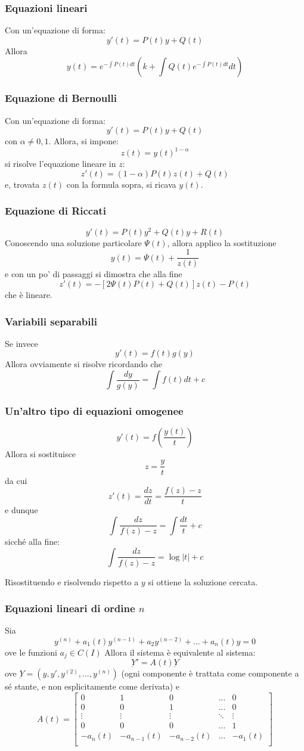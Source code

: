 \documentclass[a4paper,12pt]{article}
\begin{document}
\subsubsection{Equazioni lineari}
Con un'equazione di forma:
$$y'(t) = P(t)y+Q(t)$$
Allora
$$y(t)=e^{- \displaystyle\int P(t)dt}\left(k + \int Q(t)e^{-\displaystyle\int P(t)dt}dt\right)$$
\subsubsection{Equazione di Bernoulli}
Con un'equazione di forma:
$$y'(t) = P(t)y+Q(t)$$
con $\alpha \neq 0, 1$. Allora, si impone:
$$ z(t)=y(t)^{1-\alpha} $$
si risolve l'equazione lineare in $z$: $$z'(t)=(1-\alpha)P(t)z(t)+Q(t)$$ e, trovata $z(t)$ con la formula sopra, si ricava $y(t)$.

\subsubsection{Equazione di Riccati}
$$y'(t) = P(t)y^2+Q(t)y+R(t)$$
Conoscendo una soluzione particolare $\Psi(t)$, allora applico la sostituzione
$$y(t)=\Psi(t)+\dfrac{1}{z(t)}$$
e con un po' di passaggi si dimostra che alla fine
$$z'(t)= -\left[2\Psi(t)P(t)+Q(t)\right]z(t)-P(t)$$
che è lineare.
\subsubsection{Variabili separabili}
Se invece
$$y'(t) = f(t)g(y)$$
Allora ovviamente si risolve ricordando che
$$\int\dfrac{dy}{g(y)}=\int f(t)dt + c$$
\subsubsection{Un'altro tipo di equazioni omogenee}
$$y'(t) = f\left(\dfrac{y(t)}{t}\right)$$
Allora si sostituisce
$$z=\dfrac{y}{t}$$
da cui $$z'(t) = \dfrac{dz}{dt} = \dfrac{f(z)-z}{t}$$
e dunque
$$\int\dfrac{dz}{f(z)-z}=\int \dfrac{dt}{t} + c$$
sicché alla fine:
$$\int\dfrac{dz}{f(z)-z} = \log|t| + c$$

Risostituendo e risolvendo rispetto a $y$ si ottiene la soluzione cercata.

\subsubsection{Equazioni lineari di ordine $n$}
Sia
$$y^{(n)} + a_1(t)y^{(n-1)} + a_2y^{(n-2)} + ... + a_n(t)y = 0$$
ove le funzioni $a_j \in C(I)$
Allora il sistema è equivalente al sistema:
$$\underbar{Y}' = A(t)\underbar{Y}$$
ove $\underbar{Y}=(y, y', y^{(2)}, ..., y^{(n)})$ (ogni componente è trattata come componente a sé stante, e non esplicitamente come derivata) e
$$A(t) =
\begin{bmatrix}
0 & 1 & 0 & ... & 0\\
0 & 0 & 1 & ... & 0\\
\vdots & \vdots & \vdots & \ddots & \vdots \\
0 & 0 & 0 & ... & 1 \\
-a_n(t) & -a_{n-1}(t) & -a_{n-2}(t) & ... & -a_{1}(t) \\
\end{bmatrix}
$$
\end{document}

